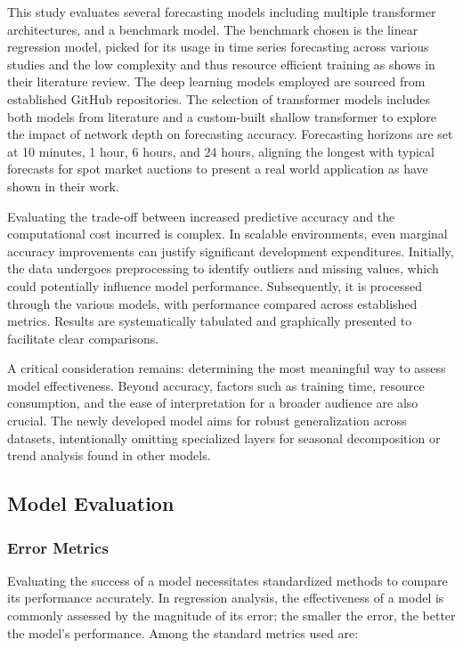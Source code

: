 \documentclass{article}
\begin{document}
This study evaluates several forecasting models including multiple transformer architectures, and a benchmark model. The benchmark chosen is the linear regression model, picked for its usage in time series forecasting across various studies and the low complexity and thus resource efficient training as \cite{linear_forecasting_survey} shows in their literature review. The deep learning models employed are sourced from established GitHub repositories. The selection of transformer models includes both models from literature and a custom-built shallow transformer to explore the impact of network depth on forecasting accuracy. Forecasting horizons are set at 10 minutes, 1 hour, 6 hours, and 24 hours, aligning the longest with typical forecasts for spot market auctions to present a real world application as \cite{spot_market_forecasting} have shown in their work.

Evaluating the trade-off between increased predictive accuracy and the computational cost incurred is complex. In scalable environments, even marginal accuracy improvements can justify significant development expenditures. Initially, the data undergoes preprocessing to identify outliers and missing values, which could potentially influence model performance. Subsequently, it is processed through the various models, with performance compared across established metrics. Results are systematically tabulated and graphically presented to facilitate clear comparisons.

A critical consideration remains: determining the most meaningful way to assess model effectiveness. Beyond accuracy, factors such as training time, resource consumption, and the ease of interpretation for a broader audience are also crucial. The newly developed model aims for robust generalization across datasets, intentionally omitting specialized layers for seasonal decomposition or trend analysis found in other models.


\subsection{Model Evaluation}
\subsubsection{Error Metrics}

Evaluating the success of a model necessitates standardized methods to compare its performance accurately. In regression analysis, the effectiveness of a model is commonly assessed by the magnitude of its error; the smaller the error, the better the model's performance. Among the standard metrics used are:
\end{document}
